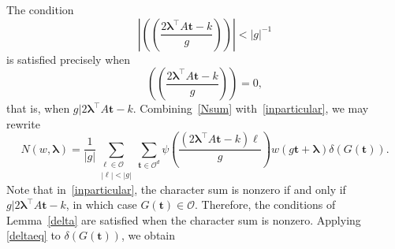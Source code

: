\documentclass[10pt]{amsart}
\theoremstyle{plain}
\theoremstyle{plain}
\renewcommand{\vec}[1]{\mathbf{#1}}
\theoremstyle{remark}
\theoremstyle{definition}
\newcommand{\cO}{\mathcal{O}}
\begin{document}
The condition 
\[\left|(\!(\frac{2\boldsymbol{\lambda}^{\intercal} A\vec{t}-k}{g})\!)\right|<|g|^{-1}\]
is satisfied precisely when 
\[(\!(\frac{2\boldsymbol{\lambda}^{\intercal} A\vec{t}-k}{g})\!)=0,\]
that is, when $g|2\boldsymbol{\lambda}^{\intercal} A\vec{t}-k$. Combining~\eqref{Nsum} with~\eqref{inparticular}, we may rewrite
\begin{equation*}
N(w,\boldsymbol{\lambda})=\frac{1}{|g|}\sum_{\substack{\ell\in \cO\\ |\ell|<|g|}}\sum_{\vec{t}\in\mathcal{O}^d} \psi\left(\frac{(2\boldsymbol{\lambda}^{\intercal} A\vec{t}-k)\ell}{g}\right)w(g\vec{t}+\boldsymbol{\lambda}) \delta{(G(\vec{t}))}.
\end{equation*}
Note that in~\eqref{inparticular}, the character sum is nonzero if and only if $g|2\boldsymbol{\lambda}^{\intercal} A\vec{t}-k$, in which case $G(\vec{t})\in\mathcal{O}$. Therefore, the conditions of Lemma~\ref{delta} are satisfied when the character sum is nonzero. Applying \eqref{deltaeq} to $\delta(G(\vec{t}))$, we obtain
\end{document}
